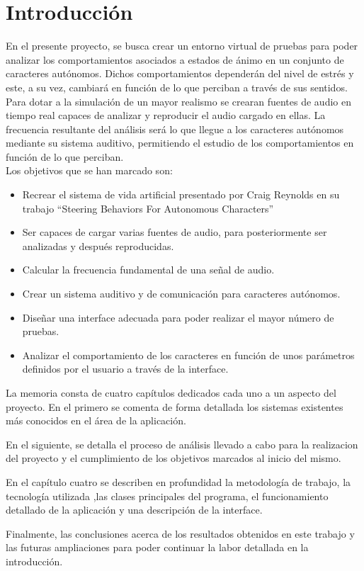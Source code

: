 \section{Introducción}
\label{chap:introduccion}

En el presente proyecto, se busca crear un entorno virtual de pruebas para poder analizar los comportamientos asociados a estados de ánimo en un conjunto de caracteres autónomos. Dichos comportamientos dependerán del nivel de estrés y este, a su vez, cambiará en función de lo que perciban a través de sus sentidos.
Para dotar a la simulación de un mayor realismo se crearan fuentes de audio en tiempo real capaces de analizar y reproducir el audio cargado en ellas.  La frecuencia resultante del análisis será lo que llegue a los caracteres autónomos mediante su sistema auditivo, permitiendo el estudio de los comportamientos en función de lo que perciban.\\  

Los objetivos que se han marcado son:
\begin{itemize}
 \item Recrear el sistema de vida artificial presentado por Craig Reynolds en su trabajo “Steering Behaviors For Autonomous Characters”
 \item Ser capaces de cargar varias fuentes de audio, para posteriormente ser analizadas y después reproducidas. 
 \item Calcular la frecuencia fundamental de una señal de audio.
 \item Crear un sistema auditivo y de comunicación para caracteres autónomos. 
 \item Diseñar una interface adecuada para poder realizar el mayor número de pruebas.  
 \item Analizar el comportamiento de los caracteres en función de unos parámetros definidos por el usuario a través de la interface.
\end{itemize}

La memoria consta de cuatro capítulos dedicados cada uno a un aspecto del proyecto. En el primero se comenta de forma detallada los sistemas existentes más conocidos en el área de la aplicación. 

En el siguiente, se detalla el proceso de análisis llevado a cabo para la realizacion del proyecto y el cumplimiento de los objetivos marcados al inicio del mismo. 

En el capítulo cuatro se describen en profundidad la metodología de trabajo, la tecnología utilizada ,las clases principales del programa, el funcionamiento detallado de la aplicación y una descripción de la interface.
                   
Finalmente, las conclusiones acerca de los resultados obtenidos en este trabajo y las futuras ampliaciones para poder continuar la labor detallada en la introducción.

              
